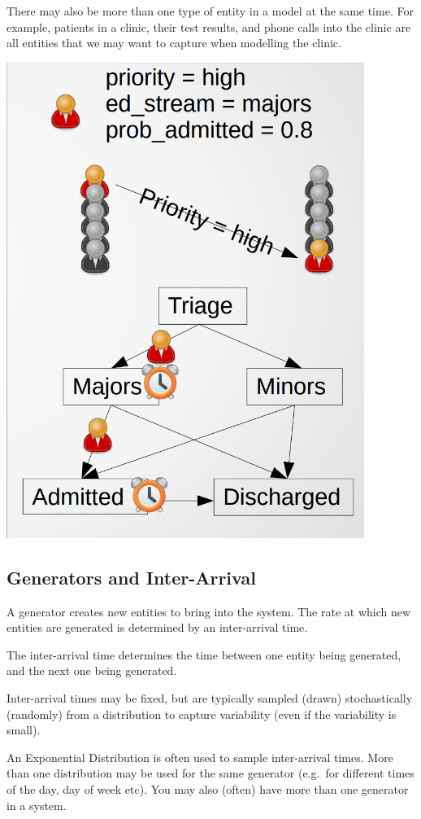 \documentclass[
  letterpaper,
  DIV=11,
  numbers=noendperiod]{scrreprt}
\begin{document}
There may also be more than one type of entity in a model at the same
time. For example, patients in a clinic, their test results, and phone
calls into the clinic are all entities that we may want to capture when
modelling the clinic.

\includegraphics{images/des_entities.png}

\subsection{Generators and
Inter-Arrival}\label{generators-and-inter-arrival}

A generator creates new entities to bring into the system. The rate at
which new entities are generated is determined by an inter-arrival time.

The inter-arrival time determines the time between one entity being
generated, and the next one being generated.

Inter-arrival times may be fixed, but are typically sampled (drawn)
stochastically (randomly) from a distribution to capture variability
(even if the variability is small).

An Exponential Distribution is often used to sample inter-arrival times.
More than one distribution may be used for the same generator (e.g.~for
different times of the day, day of week etc). You may also (often) have
more than one generator in a system.
\end{document}
